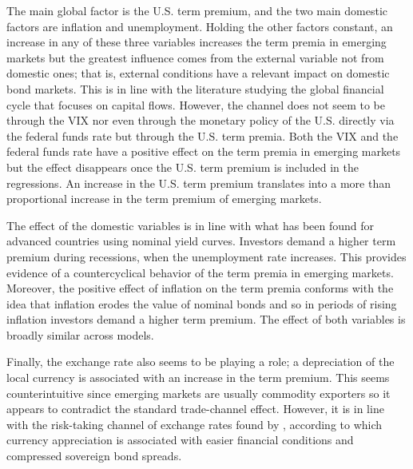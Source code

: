 The main global factor is the U.S. term premium, and the two main domestic factors are inflation and unemployment. Holding the other factors constant, an increase in any of these three variables increases the term premia in emerging markets but the greatest influence comes from the external variable not from domestic ones; that is, external conditions have a relevant impact on domestic bond markets. This is in line with the literature studying the global financial cycle that focuses on capital flows. However, the channel does not seem to be through the VIX nor even through the monetary policy of the U.S. directly via the federal funds rate but through the U.S. term premia. Both the VIX and the federal funds rate have a positive effect on the term premia in emerging markets but the effect disappears once the U.S. term premium is included in the regressions. An increase in the U.S. term premium translates into a more than proportional increase in the term premium of emerging markets.

The effect of the domestic variables is in line with what has been found for advanced countries using nominal yield curves. Investors demand a higher term premium during recessions, when the unemployment rate increases. This provides evidence of a countercyclical behavior of the term premia in emerging markets. Moreover, the positive effect of inflation on the term premia conforms with the idea that inflation erodes the value of nominal bonds and so in periods of rising inflation investors demand a higher term premium. The effect of both variables is broadly similar across models. 

Finally, the exchange rate also seems to be playing a role; a depreciation of the local currency is associated with an increase in the term premium. This seems counterintuitive since emerging markets are usually commodity exporters so it appears to contradict the standard trade-channel effect. However, it is in line with the risk-taking channel of exchange rates found by \cite{HofmannShimShin:2017}, according to which currency appreciation is associated with easier financial conditions and compressed sovereign bond spreads.

